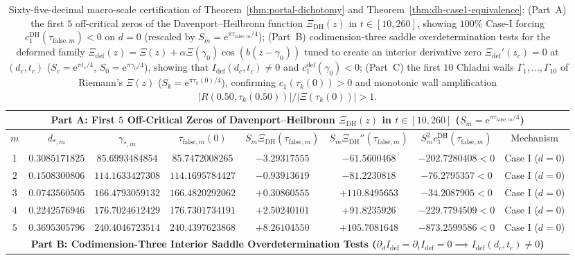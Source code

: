 \documentclass[11pt,reqno]{amsart}
\theoremstyle{definition}
\theoremstyle{remark}
\numberwithin{equation}{section}
\newcommand{\ee}{\mathrm{e}}
\newcommand{\DHf}{\mathrm{DH}}
\newcommand{\defm}{\mathrm{def}}
\begin{document}
\begin{table}[htbp]
\centering
\caption{Sixty-five-decimal macro-scale certification of Theorem~\ref{thm:portal-dichotomy} and Theorem~\ref{thm:dh-case1-equivalence}: (Part~A) the first $5$ off-critical zeros of the Davenport--Heilbronn function $\Xi_{\DHf}(z)$ in $t \in [10,260]$, showing $100\%$ Case-I forcing $c_1^{\DHf}(\tau_{\mathrm{false},m}) < 0$ on $d=0$ (rescaled by $S_m = \ee^{\pi\tau_{\mathrm{false},m}/4}$); (Part~B) codimension-three saddle overdetermination tests for the deformed family $\Xi_{\defm}(z) = \Xi(z) + \alpha\Xi(\gamma_0)\cos(b(z-\gamma_0))$ tuned to create an interior derivative zero $\Xi_{\defm}'(z_c)=0$ at $(d_c,t_c)$ ($S_c = \ee^{\pi t_c/4}$, $S_0 = \ee^{\pi\gamma_0/4}$), showing that $I_{\defm}(d_c,t_c) \ne 0$ and $c_1^{\defm}(\gamma_0) < 0$; (Part~C) the first $10$ Chladni walls $\Gamma_1,\dots,\Gamma_{10}$ of Riemann's $\Xi(z)$ ($S_k = \ee^{\pi\tau_k(0)/4}$), confirming $c_1(\tau_k(0)) > 0$ and monotonic wall amplification $|R(0.50,\tau_k(0.50))|/|\Xi(\tau_k(0))| > 1$.}
\label{tab:macro-certification}
\tiny
\setlength{\tabcolsep}{1.4pt}
\renewcommand{\arraystretch}{1.15}
\begin{tabular}{@{}cccccccc@{}}
\toprule
\multicolumn{8}{c}{\textbf{Part A: First $5$ Off-Critical Zeros of Davenport--Heilbronn $\Xi_{\DHf}(z)$ in $t \in [10,260]$ ($S_m = \ee^{\pi\tau_{\mathrm{false},m}/4}$)}} \\
\midrule
$m$ & $d_{*,m}$ & $\gamma_{*,m}$ & $\tau_{\mathrm{false},m}(0)$ & $S_m\Xi_{\DHf}(\tau_{\mathrm{false},m})$ & $S_m\Xi_{\DHf}''(\tau_{\mathrm{false},m})$ & $S_m^2 c_1^{\DHf}(\tau_{\mathrm{false},m})$ & Mechanism \\
\midrule
$1$ & $0.3085171825$ & $85.6993484854$ & $85.7472008265$ & $-3.29317555$ & $-61.5600468$ & $-202.7280408 < 0$ & Case I ($d=0$) \\
$2$ & $0.1508300806$ & $114.1633427308$ & $114.1695784427$ & $-0.93913619$ & $-81.2230818$ & $-76.2795357 < 0$ & Case I ($d=0$) \\
$3$ & $0.0743560505$ & $166.4793059132$ & $166.4820292062$ & $+0.30860555$ & $+110.8495653$ & $-34.2087905 < 0$ & Case I ($d=0$) \\
$4$ & $0.2242576946$ & $176.7024612429$ & $176.7301734191$ & $+2.50240101$ & $+91.8235926$ & $-229.7794509 < 0$ & Case I ($d=0$) \\
$5$ & $0.3695305796$ & $240.4046723514$ & $240.4397623868$ & $+8.26104550$ & $+105.7081648$ & $-873.2599586 < 0$ & Case I ($d=0$) \\
\midrule
\multicolumn{8}{c}{\textbf{Part B: Codimension-Three Interior Saddle Overdetermination Tests ($\partial_d I_{\defm} = \partial_t I_{\defm} = 0 \implies I_{\defm}(d_c,t_c) \ne 0$)}} \\

\end{tabular}
\end{table}
\end{document}
